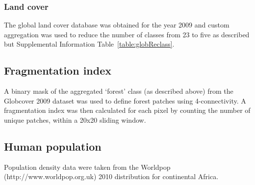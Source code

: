 \documentclass[9pt,twoside,lineno]{pnas-new}
\begin{document}
\subsubsection*{Land cover}
\label{Land cover}
The global land cover database \cite{Olivier2012Global2009} was obtained for the year 2009 and custom aggregation was used to reduce the number of classes from 23 to five as described but Supplemental Information Table~\ref{table:globReclass}.\par

\subsection*{Fragmentation index}
A binary mask of the aggregated `forest' class (as described above) from the Globcover 2009 dataset \cite{Olivier2012Global2009} was used to define forest patches using 4-connectivity.
A fragmentation index was then calculated for each pixel by counting the number of unique patches, within a 20x20 sliding window. \par

\subsection*{Human population}
Population density data were taken from the Worldpop (http://www.worldpop.org.uk) 2010 distribution for continental Africa.


\end{document}
